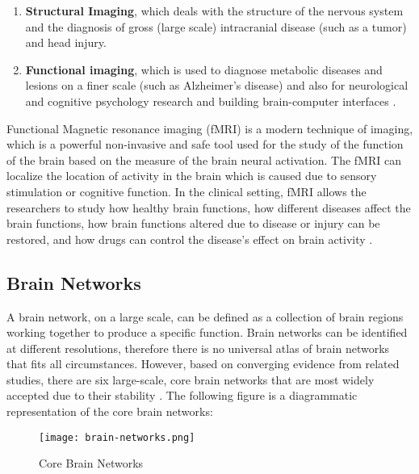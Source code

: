 \documentclass[12pt]{article}
\begin{document}
\begin{enumerate}

  \item \textbf{Structural Imaging}, which deals with the structure of
    the nervous system and the diagnosis of gross (large scale)
    intracranial disease (such as a tumor) and head injury.

  \item \textbf{Functional imaging}, which is used to diagnose
    metabolic diseases and lesions on a finer scale (such as
    Alzheimer’s disease) and also for neurological and cognitive
    psychology research and building brain-computer interfaces
    \cite{neuroimaging}.

\end{enumerate}

Functional Magnetic resonance imaging (fMRI) is a modern technique of
imaging, which is a powerful non-invasive and safe tool used for the
study of the function of the brain based on the measure of the brain
neural activation. The fMRI can localize the location of activity in
the brain which is caused due to sensory stimulation or cognitive
function. In the clinical setting, fMRI allows the researchers to
study how healthy brain functions, how different diseases affect the
brain functions, how brain functions altered due to disease or injury
can be restored, and how drugs can control the disease’s effect on
brain activity \cite{fMRI}.

\subsection{Brain Networks}

A brain network, on a large scale, can be defined as a collection of
brain regions working together to produce a specific function. Brain
networks can be identified at different resolutions, therefore there
is no universal atlas of brain networks that fits all
circumstances. However, based on converging evidence from related
studies, there are six large-scale, core brain networks that are most
widely accepted due to their stability
\cite{estimatingLargeScaleNetworks}. The following figure is
a diagrammatic representation of the core brain networks:

\begin{figure}[H]
  \centering
  \texttt{[image: brain-networks.png]}
  \caption{Core Brain Networks}
  \cite{dorsalattentionfronto}\cite{Majorbrainnetworks}
\end{figure}
\end{document}
